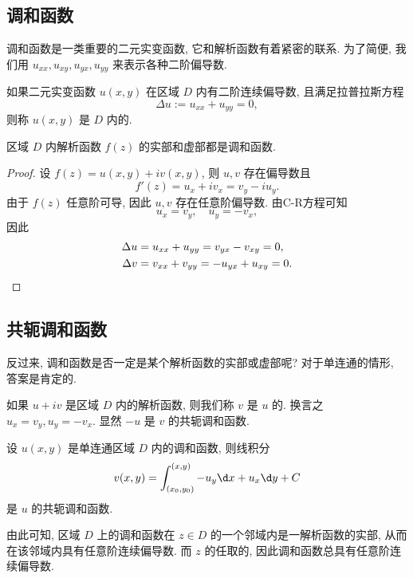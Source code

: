\subsection{调和函数}

调和函数是一类重要的二元实变函数, 它和解析函数有着紧密的联系.
为了简便, 我们用 $u_{xx},u_{xy},u_{yx},u_{yy}$ 来表示各种二阶偏导数.

\begin{definition}
  如果二元实变函数 $u(x,y)$ 在区域 $D$ 内有二阶连续偏导数, 且满足拉普拉斯\footnotemark 方程
  \[
    \Delta u:=u_{xx}+u_{yy}=0,
  \]
  则称 $u(x,y)$ 是 $D$ 内的.
\end{definition}

\begin{theorem}
  区域 $D$ 内解析函数 $f(z)$ 的实部和虚部都是调和函数.
\end{theorem}

\begin{proof}
  设 $f(z)=u(x,y)+iv(x,y)$, 则 $u,v$ 存在偏导数且
  \[
    f'(z)=u_x+iv_x=v_y-iu_y.
  \]
  由于 $f(z)$ 任意阶可导, 因此 $u,v$ 存在任意阶偏导数.
  由C-R方程可知
  \[
    u_x=v_y,\quad u_y=-v_x,
  \]
  因此
  \begin{align*}
    \Delta u&=u_{xx}+u_{yy}=v_{yx}-v_{xy}=0,\\
    \Delta v&=v_{xx}+v_{yy}=-u_{yx}+u_{xy}=0.\qedhere\end{align*}
    
\end{proof}

\subsection{共轭调和函数}

反过来, 调和函数是否一定是某个解析函数的实部或虚部呢?
对于单连通的情形, 答案是肯定的.

如果 $u+iv$ 是区域 $D$ 内的解析函数, 则我们称 $v$ 是 $u$ 的.
换言之 $u_x=v_y,u_y=-v_x$.
显然 $-u$ 是 $v$ 的共轭调和函数.

\begin{theorem}
  设 $u(x,y)$ 是单连通区域 $D$ 内的调和函数, 则线积分
  \[
    v(x,y)=\int_{(x_0,y_0)}^{(x,y)}-u_y\d x+u_x\d y+C
  \]
  是 $u$ 的共轭调和函数.
\end{theorem}

由此可知, 区域 $D$ 上的调和函数在 $z\in D$ 的一个邻域内是一解析函数的实部, 从而在该邻域内具有任意阶连续偏导数.
而 $z$ 的任取的, 因此\alert{调和函数总具有任意阶连续偏导数}.

